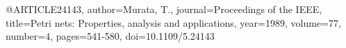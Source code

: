 @ARTICLE{24143,
  author={Murata, T.},
  journal={Proceedings of the IEEE}, 
  title={Petri nets: Properties, analysis and applications}, 
  year={1989},
  volume={77},
  number={4},
  pages={541-580},
  doi={10.1109/5.24143}}